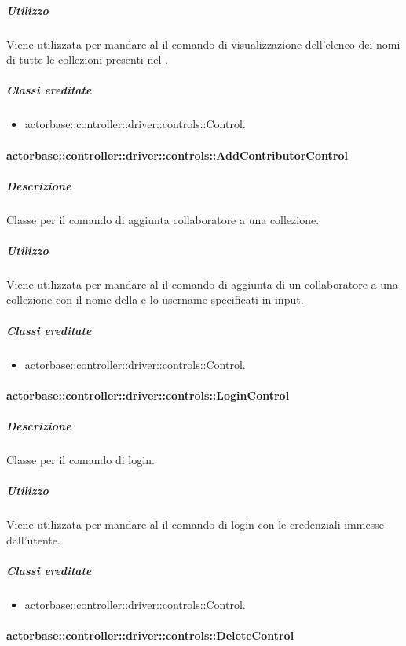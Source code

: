 \documentclass{scalatekids-article}
\begin{document}
\subparagraph{Utilizzo}

Viene utilizzata per mandare al  il comando di visualizzazione dell'elenco dei nomi di tutte le collezioni presenti nel .

\subparagraph{Classi ereditate}

\begin{itemize}
\item actorbase::controller::driver::controls::Control.
\end{itemize}

\paragraph{actorbase::controller::driver::controls::AddContributorControl}

\subparagraph{Descrizione}

Classe per il comando di aggiunta collaboratore a una collezione.

\subparagraph{Utilizzo}

Viene utilizzata per mandare al  il comando di aggiunta di un collaboratore a una collezione con il nome della  e lo username specificati in input.

\subparagraph{Classi ereditate}

\begin{itemize}
\item actorbase::controller::driver::controls::Control.
\end{itemize}

\paragraph{actorbase::controller::driver::controls::LoginControl}

\subparagraph{Descrizione}

Classe per il comando di login.

\subparagraph{Utilizzo}

Viene utilizzata per mandare al  il comando di login con le credenziali immesse dall'utente.

\subparagraph{Classi ereditate}

\begin{itemize}
\item actorbase::controller::driver::controls::Control.
\end{itemize}

\paragraph{actorbase::controller::driver::controls::DeleteControl}
\end{document}
